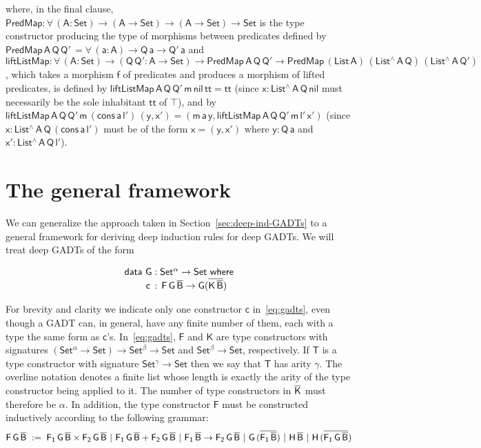 \documentclass[9pt]{entcs}
\begin{document}
\noindent
where, in the final clause, $\mathsf{PredMap : \forall\, (A : Set) \to
  (A \to Set) \to (A \to Set) \to Set }$ is the type constructor
producing the type of morphisms between predicates defined by
$\mathsf{PredMap \,A\, Q\,Q'\, = \forall\, (a : A) \to Q\,a \to
  Q'\,a}$ and $\mathsf{liftListMap : \forall\, (A : Set) \to (Q \, Q'
  : A \to Set) \to PredMap\,A\,Q\,Q' \to PredMap\,(List\,A)
  \,(List^{\wedge}\, A\, Q)\, (List^{\wedge}\, A\, Q')}$, which takes
a morphism $\mathsf{f}$ of predicates and produces a morphism of
lifted predicates, is defined by $\mathsf{liftListMap\, A\, Q\, Q'\,
  m\, nil\, tt = tt}$ (since $\mathsf{x : List^{\wedge}\, A\, Q\,
  nil}$ must necessarily be the sole inhabitant $\mathsf{tt}$ of
$\mathsf{\top}$), and by $\mathsf{liftListMap\, A\, Q\, Q'\, m\,
  (cons\, a\, l')\, (y, x') = (m\,a\,y, liftListMap\, A\, Q\, Q'\, m\,
  l'\, x')}$ (since $\mathsf{x : List^{\wedge}\, A\, Q\, (cons\, a\,
  l')}$ must be of the form $\mathsf{x = (y, x')}$ where
$\mathsf{y : Q\,a}$ and $\mathsf{x' : List^{\wedge}\, A\, Q\, l'}$).

\vspace*{-0.05in}

\section{The general framework}\label{sec:framework}

We can generalize the approach taken in
Section~\ref{sec:deep-ind-GADTs} to a general framework for deriving
deep induction rules for deep GADTs. We will treat deep GADTs of the
form 

\vspace*{-0.05in}

\begin{equation}\label{eq:gadts}
\begin{array}{l}
  \mathsf{data\ G : Set^\alpha
    \to Set\ where}\\
\mathsf{\;\;\;\;\;\;\;\;c\, :\, F\,G\,\overline{B} \to G (\overline{K\,\overline{B}})}
\end{array}
\end{equation}

\noindent
For brevity and clarity we indicate only one constructor $\mathsf{c}$
in~\eqref{eq:gadts}, even though a GADT can, in general, have any
finite number of them, each with a type the same form as
$\mathsf{c}$'s. In~\eqref{eq:gadts}, $\mathsf{F}$ and $\mathsf{K}$ are
type constructors with signatures $\mathsf{(Set^{\alpha} \to Set) \to
  Set^{\beta} \to Set}$ and $\mathsf{Set^{\beta} \to Set}$,
respectively. If $\mathsf{T}$ is a type constructor with signature
$\mathsf{Set^{\gamma} \to Set}$ then we say that $\mathsf{T}$ has
arity $\mathsf{\gamma}$.  The overline notation denotes a finite list
whose length is exactly the arity of the type constructor being
applied to it. The number of type constructors in $\overline{\mathsf{K}}$
must therefore be $\alpha$. In addition, the type constructor
$\mathsf{F}$ must be constructed inductively according to the
following grammar:
\[\mathsf{F\,G\,\overline{B}\; :=\;
F_1\,G\,\overline{B} \times F_2\,G\,\overline{B} \ \vert\ F_1\,G\,\overline{B} +
F_2\,G\,\overline{B} \ \vert\ F_1\,\overline{B} \to F_2\,G\,\overline{B}
\ \vert\ G\,(\overline{F_1\,\overline{B}}) \ \vert\ H\,\overline{B} \ \vert\ H\,
(\overline{F_1\,G\,\overline{B}}) }\]
\end{document}
